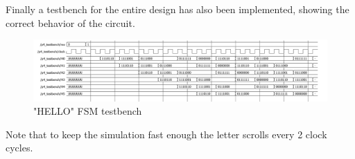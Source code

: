\documentclass[12pt]{article}
\begin{document}
Finally a testbench for the entire design has also been implemented, showing the correct behavior of the circuit.
\begin{figure}[!h]
	\centering
	\includegraphics[scale = 0.55]{immagini/niki/disp.PNG}
	\caption{"HELLO" FSM testbench}
\end{figure}

Note that to keep the simulation fast enough the letter scrolls every 2 clock cycles.
\end{document}
